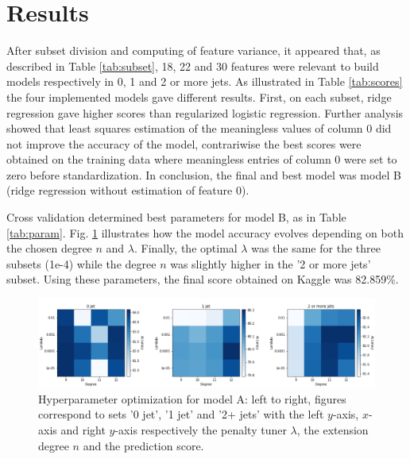 \documentclass[10pt,conference,compsocconf]{IEEEtran}
\begin{document}
\section{Results} 
\label{sec:results}
After subset division and computing of feature variance, it appeared that, as described in Table \ref{tab:subset}, 18, 22 and 30 features were relevant to build models respectively in 0, 1 and 2 or more jets.
As illustrated in Table \ref{tab:scores} the four implemented models gave different results. First, on each subset, ridge regression gave higher scores than regularized logistic regression. Further analysis showed that least squares estimation of the meaningless values of column 0 did not improve the accuracy of the model, contrariwise the best scores were obtained on the training data where meaningless entries of column 0 were set to zero before standardization.
In conclusion, the final and best model was model B (ridge regression without estimation of feature 0).

Cross validation determined best parameters for model B, as in Table \ref{tab:param}.  Fig. \ref{param} illustrates how the model accuracy evolves depending on both the chosen degree $n$ and $\lambda$. Finally, the optimal $\lambda$ was the same for the three subsets (1e-4) while the degree $n$ was slightly higher in the '2 or more jets' subset.
Using these parameters, the final score obtained on Kaggle was 82.859\%.

\begin{figure}
\begin{center}
\includegraphics[scale=0.235]{best_parameters.png}
\caption{Hyperparameter optimization for model A: left to right, figures correspond to sets '0 jet', '1 jet' and '2+ jets' with the left $y$-axis, $x$-axis and right $y$-axis respectively the penalty tuner $\lambda$, the extension degree $n$ and the prediction score.}
\label{param}
\end{center}
\end{figure}
\end{document}
